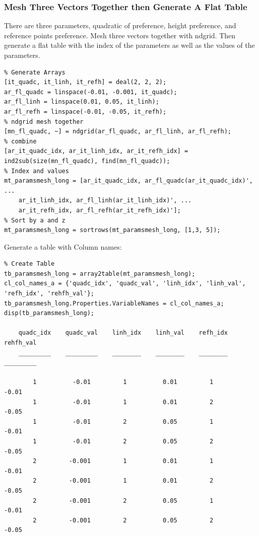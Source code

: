 \documentclass[
]{book}
\begin{document}
\hypertarget{mesh-three-vectors-together-then-generate-a-flat-table}{%
\subsubsection{Mesh Three Vectors Together then Generate A Flat Table}\label{mesh-three-vectors-together-then-generate-a-flat-table}}

There are three parameters, quadratic of preference, height preference,
and reference points preference. Mesh three vectors together with
ndgrid. Then generate a flat table with the index of the parameters as
well as the values of the parameters.

\begin{verbatim}
% Generate Arrays
[it_quadc, it_linh, it_refh] = deal(2, 2, 2);
ar_fl_quadc = linspace(-0.01, -0.001, it_quadc);
ar_fl_linh = linspace(0.01, 0.05, it_linh);
ar_fl_refh = linspace(-0.01, -0.05, it_refh);
% ndgrid mesh together
[mn_fl_quadc, ~] = ndgrid(ar_fl_quadc, ar_fl_linh, ar_fl_refh);
% combine
[ar_it_quadc_idx, ar_it_linh_idx, ar_it_refh_idx] = ind2sub(size(mn_fl_quadc), find(mn_fl_quadc));
% Index and values
mt_paramsmesh_long = [ar_it_quadc_idx, ar_fl_quadc(ar_it_quadc_idx)', ...
    ar_it_linh_idx, ar_fl_linh(ar_it_linh_idx)', ...
    ar_it_refh_idx, ar_fl_refh(ar_it_refh_idx)'];
% Sort by a and z
mt_paramsmesh_long = sortrows(mt_paramsmesh_long, [1,3, 5]);
\end{verbatim}

Generate a table with Column names:

\begin{verbatim}
% Create Table
tb_paramsmesh_long = array2table(mt_paramsmesh_long);
cl_col_names_a = {'quadc_idx', 'quadc_val', 'linh_idx', 'linh_val', 'refh_idx', 'rehfh_val'};
tb_paramsmesh_long.Properties.VariableNames = cl_col_names_a;
disp(tb_paramsmesh_long);

    quadc_idx    quadc_val    linh_idx    linh_val    refh_idx    rehfh_val
    _________    _________    ________    ________    ________    _________

        1          -0.01         1          0.01         1          -0.01  
        1          -0.01         1          0.01         2          -0.05  
        1          -0.01         2          0.05         1          -0.01  
        1          -0.01         2          0.05         2          -0.05  
        2         -0.001         1          0.01         1          -0.01  
        2         -0.001         1          0.01         2          -0.05  
        2         -0.001         2          0.05         1          -0.01  
        2         -0.001         2          0.05         2          -0.05  
\end{verbatim}
\end{document}
